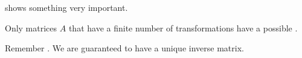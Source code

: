  shows something very important.
\begin{remark*}
  Only matrices $A$ that have a finite number of  transformations have a possible .

  Remember .
  We are guaranteed to have a unique inverse matrix.
\end{remark*}

